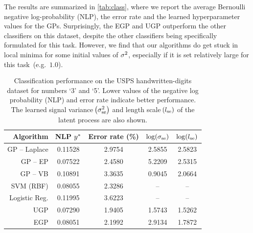 \documentclass{article} %
\begin{document}

The results are summarized in \autoref{tab:class}, where we report the average
Bernoulli negative log-probability (NLP), the error rate and the learned
hyperparameter values for the GPs. Surprisingly, the EGP and UGP outperform the
other classifiers on this dataset, despite the other classifiers being
specifically formulated for this task. However, we find that our algorithms do
get stuck in local minima for some initial values of $\sigma^2$, especially if it
is set relatively large for this task~(e.g.~$1.0$).

\begin{table}[tb]
    \centering
    \caption[]{Classification performance on the USPS handwritten-digits dataset for
    numbers `3' and `5'. Lower values of the negative log probability (NLP) and 
    error rate indicate better performance. The learned  signal variance 
    $\!\left({\sigma^{2}_\text{se}}\right)$ and  length scale  $\!\left({l_\text{se}}\right)$ 
    of the latent process are also shown.
    }
    \footnotesize
    \begin{tabular}{r| c c c c}
        Algorithm & NLP $y^{*}$ & Error rate (\%) 
            & $\log\!\left({\sigma_\text{se}}\right)$ & $\log\!\left({l_\text{se}}\right)$ \\
        \toprule
        GP -- Laplace & 0.11528 & 2.9754 & 2.5855 & 2.5823 \\
        GP -- EP & 0.07522 & 2.4580 & 5.2209 & 2.5315 \\
        GP -- VB & 0.10891 & 3.3635 & 0.9045 & 2.0664 \\ 
        SVM (RBF) & 0.08055 & 2.3286 & -- & -- \\
        Logistic Reg. & 0.11995 & 3.6223 & -- & -- \\
        \midrule
        UGP & 0.07290 & 1.9405 & 1.5743 & 1.5262 \\
        EGP & 0.08051 & 2.1992 & 2.9134 & 1.7872 \\
        \bottomrule
    \end{tabular}
    \label{tab:class}
\end{table}
\end{document}
